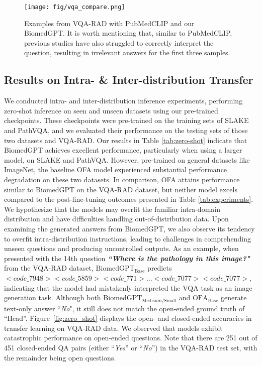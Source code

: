 \documentclass[10pt]{article} \usepackage[preprint]{tmlr}
\begin{document}
\begin{figure*}[]
    \centering
    \texttt{[image: fig/vqa\_compare.png]}
    \caption{Examples from VQA-RAD with PubMedCLIP and our BiomedGPT. It is worth mentioning that, similar to PubMedCLIP, previous studies \citep{nguyen2019overcoming, zhan2020medical} have also struggled to correctly interpret the question, resulting in irrelevant answers for the first three samples.}
    \label{fig:vqa_compare}
\end{figure*}

\subsection{Results on Intra- \& Inter-distribution Transfer}

We conducted intra- and inter-distribution inference experiments, performing zero-shot inference on seen and unseen datasets using our pre-trained checkpoints. These checkpoints were pre-trained on the training sets of SLAKE and PathVQA, and we evaluated their performance on the testing sets of those two datasets and VQA-RAD. Our results in Table \ref{tab:zero-shot} indicate that BiomedGPT achieves excellent performance, particularly when using a larger model, on SLAKE and PathVQA. However, pre-trained on general datasets like ImageNet, the baseline OFA model experienced substantial performance degradation on these two datasets. In comparison, OFA attains performance similar to BiomedGPT on the VQA-RAD dataset, but neither model excels compared to the post-fine-tuning outcomes presented in Table \ref{tab:experiments}. We hypothesize that the models may overfit the familiar intra-domain distribution and have difficulties handling out-of-distribution data. Upon examining the generated answers from BiomedGPT, we also observe its tendency to overfit intra-distribution instructions, leading to challenges in comprehending unseen questions and producing uncontrolled outputs. As an example, when presented with the 14th question \textbf{\textit{``Where is the pathology in this image?"}} from the VQA-RAD dataset, $\text{BiomedGPT}_{\text{Base}}$ predicts $<code\_{7948}> <code\_{5859}> <code\_{771}> \dots <code\_7077><code\_7077>$, indicating that the model had mistakenly interpreted the VQA task as an image generation task. Although both $\text{BiomedGPT}_{\text{Medisum/Small}}$ and $\text{OFA}_{\text{Base}}$ generate text-only answer ``\textit{No}", it still does not match the open-ended ground truth of ``Head''. Figure~\ref{fig:zero_shot} displays the open- and closed-ended accuracies in transfer learning on VQA-RAD data. We observed that models exhibit catastrophic performance on open-ended questions. Note that there are 251 out of 451 closed-ended QA pairs (either ``\textit{Yes}'' or ``\textit{No}'') in the VQA-RAD test set, with the remainder being open questions.
\end{document}
